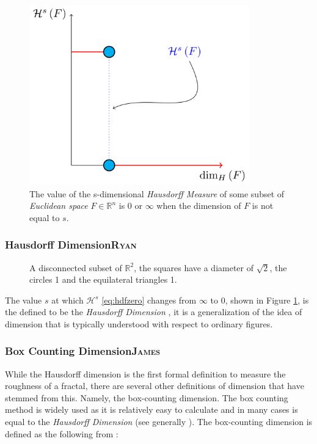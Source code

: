 \documentclass[a4paper,11pt,twoside]{article}
\begin{document}
\begin{figure}[htbp]
\centering
\includegraphics[width=0.85\textwidth]{media/tikz/hausdorff-dimension-plot.png}
\caption{\label{hausdorff-vals}The value of the s-dimensional \emph{Hausdorff Measure} of some subset of \emph{Euclidean space} \(F\in \mathbb{R}^{n}\) is 0 or \(\infty\) when the dimension of \(F\) is not equal to \(s\).}
\end{figure}

\subsubsection{Hausdorff Dimension\hfill{}\textsc{Ryan}}
\label{sec:org04ad79a}

\begin{figure}
\centering

\caption{\label{abstract-shape}A disconnected subset of \(\mathbb{R}^{2}\), the squares have a diameter of \(\sqrt{2}\), the circles 1 and the equilateral triangles 1.}
\end{figure}


The value \(s\) at which \(\mathcal{H}^{s}\) \eqref{eq:hdfzero} changes from \(\infty\) to 0, shown in Figure \ref{hausdorff-vals},  is the defined to be the \emph{Hausdorff Dimension} \cite[\S 2.2]{falconerFractalGeometryMathematical2003b}, it is a generalization of the idea of dimension that is typically understood with respect to ordinary figures.

\subsubsection{Box Counting Dimension\hfill{}\textsc{James}}
\label{box-count-dim}
While the Hausdorff dimension is the first formal definition to measure
the roughness of a fractal, there are several other definitions of dimension
that have stemmed from this. Namely, the box-counting dimension. The box
counting method is widely used as it is relatively easy to calculate \cite[p. 41]{falconerFractalGeometryMathematical2003b}
and in many cases is equal to the \emph{Hausdorff Dimension}  \cite[p. 11]{markpollicottFractalsDimensionTheory2005} (see generally \cite{ListFractalsHausdorff2020}).
The box-counting dimension is defined as the following from
\cite{falconerFractalGeometryMathematical2003}:
\end{document}
